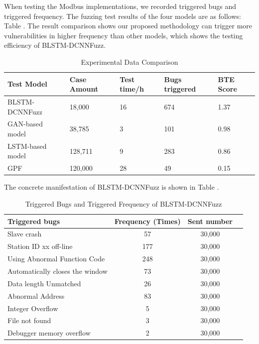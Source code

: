 When testing the Modbus implementations, we recorded triggered bugs and triggered frequency. The fuzzing test results of the four models are as follows: Table \uppercase\expandafter{}. The result comparison shows our proposed methodology can trigger more vulnerabilities in higher frequency than other models, which shows the testing efficiency of BLSTM-DCNNFuzz.
\begin{table}[htbp]
	\caption{Experimental Data Comparison}
	\label{table_example}
	\centering
	\begin{tabular}{m{70pt}<{\centering}  p{30pt}<{\centering} p{30pt}<{\centering}  p{32pt}<{\centering}  p{30pt}<{\centering}}%
		\toprule
		\bfseries Test Model &  \bfseries Case Amount &  \bfseries Test time/h &\bfseries Bugs triggered  &\bfseries BTE Score\\
		\midrule
		BLSTM-DCNNFuzz & 18,000 & 16 & 674 & 1.37\\
		GAN-based model & 38,785 & 3 & 101 & 0.98\\
		LSTM-based model & 128,711 &  9 & 283 & 0.86\\
		GPF				 & 120,000 & 28 & 49   & 0.15 \\
		\bottomrule
	\end{tabular}
\end{table}

The concrete manifestation of BLSTM-DCNNFuzz is shown in Table \uppercase\expandafter{}. 
\begin{table}[htbp]
	\caption{Triggered Bugs and Triggered Frequency of BLSTM-DCNNFuzz}
	\label{table_example}
	\centering
	\begin{tabular}{lccc}
		\toprule
		\bfseries Triggered bugs &  \bfseries Frequency (Times) & \bfseries Sent number\\
		\midrule
		Slave crash & 57 & 30,000\\
		Station ID xx off-line & 177 & 30,000 \\
		Using Abnormal Function Code & 248 & 30,000 \\
		Automatically closes the window & 73 & 30,000\\
		Data length Unmatched & 26 & 30,000 \\
		Abnormal Address & 83 & 30,000 \\
		Integer Overflow & 5 & 30,000 \\
		File not found & 3 & 30,000\\
		Debugger memory overflow & 2 & 30,000 \\
		\bottomrule
	\end{tabular}
\end{table}

